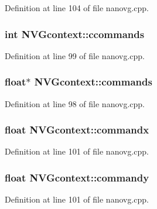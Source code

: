 Definition at line 104 of file nanovg.\+cpp.

\hypertarget{struct_n_v_gcontext_abdd400974a0e442333120fb98d5e49e7}{
\subsubsection[{ccommands}]{\setlength{\rightskip}{0pt plus 5cm}int N\+V\+Gcontext\+::ccommands}}\label{struct_n_v_gcontext_abdd400974a0e442333120fb98d5e49e7}


Definition at line 99 of file nanovg.\+cpp.

\hypertarget{struct_n_v_gcontext_a24bc3804b6b64c955e7318835f033f31}{
\subsubsection[{commands}]{\setlength{\rightskip}{0pt plus 5cm}float$\ast$ N\+V\+Gcontext\+::commands}}\label{struct_n_v_gcontext_a24bc3804b6b64c955e7318835f033f31}


Definition at line 98 of file nanovg.\+cpp.

\hypertarget{struct_n_v_gcontext_abe9bb2cd4ee241f6bf9d1dc5ca1b2d5c}{
\subsubsection[{commandx}]{\setlength{\rightskip}{0pt plus 5cm}float N\+V\+Gcontext\+::commandx}}\label{struct_n_v_gcontext_abe9bb2cd4ee241f6bf9d1dc5ca1b2d5c}


Definition at line 101 of file nanovg.\+cpp.

\hypertarget{struct_n_v_gcontext_a93da42b3cceca9295f2d61bd6291aba5}{
\subsubsection[{commandy}]{\setlength{\rightskip}{0pt plus 5cm}float N\+V\+Gcontext\+::commandy}}\label{struct_n_v_gcontext_a93da42b3cceca9295f2d61bd6291aba5}


Definition at line 101 of file nanovg.\+cpp.

